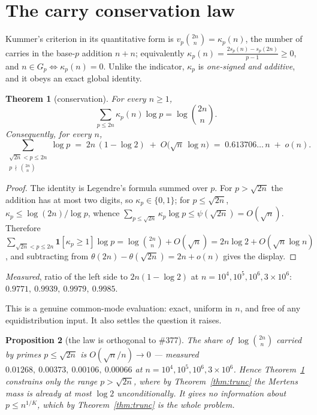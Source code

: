 \documentclass[11pt]{article}
\newtheorem{theorem}{Theorem}
\newtheorem{proposition}[theorem]{Proposition}
\begin{document}
\section{The carry conservation law}

Kummer's criterion in its quantitative form is $v_p\binom{2n}{n}=\kappa_p(n)$,
the number of carries in the base-$p$ addition $n+n$; equivalently
$\kappa_p(n)=\frac{2s_p(n)-s_p(2n)}{p-1}\ge0$, and $n\in G_p\iff\kappa_p(n)=0$.
Unlike the indicator, $\kappa_p$ is \emph{one-signed and additive}, and it obeys
an exact global identity.

\begin{theorem}[conservation]\label{thm:cons}
For every $n\ge1$,
\[
  \sum_{p\le2n}\kappa_p(n)\log p=\log\binom{2n}{n}.
\]
Consequently, for every $n$,
\[
  \sum_{\substack{\sqrt{2n}<p\le2n\\ p\,\nmid\,\binom{2n}{n}}}\log p
  \;=\;2n\,(1-\log 2)\;+\;O\!\bigl(\sqrt n\,\log n\bigr)
  \;=\;0.613706\ldots\,n\;+\;o(n).
\]
\end{theorem}

\begin{proof}
The identity is Legendre's formula summed over $p$.  For $p>\sqrt{2n}$ the
addition has at most two digits, so $\kappa_p\in\{0,1\}$; for $p\le\sqrt{2n}$,
$\kappa_p\le\log(2n)/\log p$, whence
$\sum_{p\le\sqrt{2n}}\kappa_p\log p\le\psi(\sqrt{2n})=O(\sqrt n)$.  Therefore
$\sum_{\sqrt{2n}<p\le2n}\mathbf1[\kappa_p\ge1]\log p=\log\binom{2n}{n}+O(\sqrt n)
=2n\log2+O(\sqrt n\log n)$, and subtracting from
$\theta(2n)-\theta(\sqrt{2n})=2n+o(n)$ gives the display.
\end{proof}

\emph{Measured}, ratio of the left side to $2n(1-\log2)$ at
$n=10^4,10^5,10^6,3\times10^6$: $0.9771,\ 0.9939,\ 0.9979,\ 0.9985$.

This is a genuine common-mode evaluation: exact, uniform in $n$, and free of any
equidistribution input.  It also settles the question it raises.

\begin{proposition}[the law is orthogonal to \#377]\label{prop:orth}
The share of $\log\binom{2n}{n}$ carried by primes $p\le\sqrt{2n}$ is
$O(\sqrt n/n)\to0$ --- measured $0.01268,\ 0.00373,\ 0.00106,\ 0.00066$ at
$n=10^4,10^5,10^6,3\times10^6$.  Hence Theorem~\ref{thm:cons} constrains only
the range $p>\sqrt{2n}$, where by Theorem~\ref{thm:trunc} the Mertens mass is
already at most $\log2$ unconditionally.  It gives \emph{no} information about
$p\le n^{1/K}$, which by Theorem~\ref{thm:trunc} is the whole problem.
\end{proposition}
\end{document}
